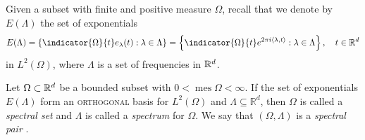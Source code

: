 \documentclass[../thesis.tex]{subfiles}
\begin{document}






Given a subset with finite and positive measure $\Omega$, recall that we denote by $E(\Lambda)$ the set of exponentials
\begin{align*}%
    E(\Lambda) = \braqMed{\indicator{\Omega}{t} e_\lambda(t) : \lambda \in \Lambda} = \braqMed{\indicator{\Omega}{t} e^{2 \pi i \braa{\lambda, t}} : \lambda \in \Lambda}, \quad t\in \R^d
\end{align*}
in $L^2(\Omega)$, where $\Lambda$ is a set of frequencies in $\mathbb{R}^d$.
\begin{definition} \label{def:spectral_set}
    Let $\Omega \subset \mathbb{R}^d$ be a bounded subset with $0< \operatorname{mes} \Omega < \infty$. If the set of exponentials $E(\Lambda)$ form an \textsc{orthogonal} basis for $L^2 (\Omega)$ and $\Lambda \subseteq \mathbb{R}^d$, then $\Omega$ is called a \emph{spectral set} and $\Lambda$ is called a \emph{spectrum} for $\Omega$. We say that $(\Omega, \Lambda)$ is a \emph{spectral pair} \cite{liuUniformityNonUniformGabor2003}.
\end{definition} 
\end{document}
